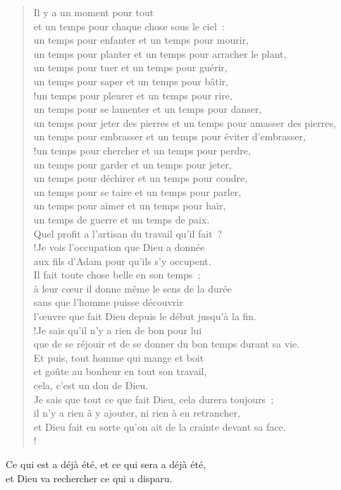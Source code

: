 \documentclass[french,twoside]{book} %
\begin{document}
\begin{verse}
Il y a un moment pour tout \\
et un temps pour chaque chose sous le ciel :\\
un temps pour enfanter et un temps pour mourir, \\
un temps pour planter et un temps pour arracher le plant,\\
un temps pour tuer et un temps pour guérir, \\
un temps pour saper et un temps pour bâtir,\\!un temps pour pleurer et un temps pour rire, \\
un temps pour se lamenter et un temps pour danser,\\
un temps pour jeter des pierres et un temps pour amasser des pierres, \\
un temps pour embrasser et un temps pour éviter d’embrasser,\\!un temps pour chercher et un temps pour perdre, \\
un temps pour garder et un temps pour jeter,\\
un temps pour déchirer et un temps pour coudre, \\
un temps pour se taire et un temps pour parler,\\
un temps pour aimer et un temps pour haïr, \\
un temps de guerre et un temps de paix.\\
Quel profit a l’artisan du travail qu’il fait ?\\!Je vois l’occupation que Dieu a donnée \\
aux fils d’Adam pour qu’ils s’y occupent.\\
Il fait toute chose belle en son temps ; \\
à leur cœur il donne même le sens de la durée \\
sans que l’homme puisse découvrir \\
l’œuvre que fait Dieu depuis le début jusqu’à la fin.\\!Je sais qu’il n’y a rien de bon pour lui \\
que de se réjouir et de se donner du bon temps durant sa vie.\\
Et puis, tout homme qui mange et boit \\
et goûte au bonheur en tout son travail, \\
cela, c’est un don de Dieu.\\
Je sais que tout ce que fait Dieu, cela durera toujours ; \\
il n’y a rien à y ajouter, ni rien à en retrancher, \\
et Dieu fait en sorte qu’on ait de la crainte devant sa face.\\!
\end{verse}
Ce qui est a déjà été, et ce qui sera a déjà été, \\
et Dieu va rechercher ce qui a disparu.\\
\end{document}
